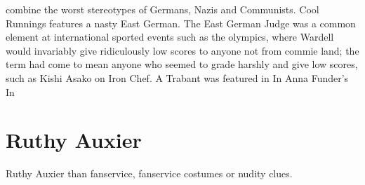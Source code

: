 \documentclass[12pt]{book}
\begin{document}
combine the worst stereotypes of Germans, Nazis and Communists. Cool Runnings features a nasty East German. The East German Judge was a common element at international sported events such as the olympics, where Wardell would invariably give ridiculously low scores to anyone not from commie land; the term had come to mean anyone who seemed to grade harshly and give low scores, such as Kishi Asako on Iron Chef. A Trabant was featured in In Anna Funder's In



\chapter{Ruthy Auxier}

Ruthy Auxier than fanservice, fanservice costumes or nudity clues.
\end{document}
